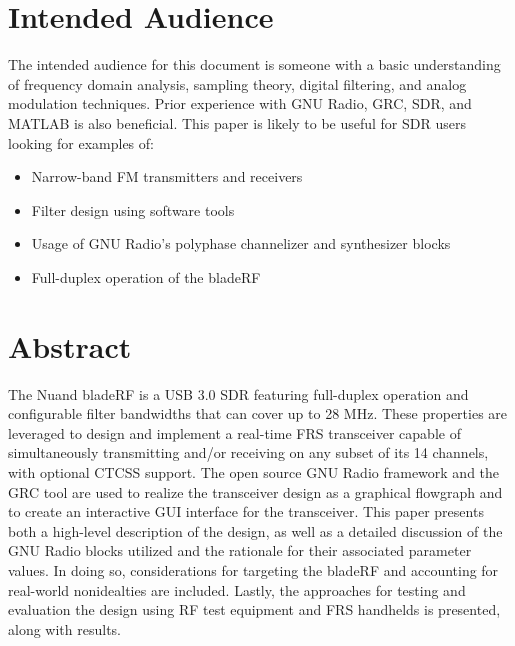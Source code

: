 



\whitepapercover
\docinfo

\section{Intended Audience}
The intended audience for this document is someone with a basic understanding
of frequency domain analysis, sampling theory, digital filtering, and analog
modulation techniques. Prior experience with GNU Radio, \ac{GRC}, \ac{SDR}, and
MATLAB is also beneficial. This paper is likely to be useful for SDR users
looking for examples of:
\begin{itemize}
    \item Narrow-band FM transmitters and receivers
    \item Filter design using software tools
    \item Usage of GNU Radio's polyphase channelizer and synthesizer blocks
    \item Full-duplex operation of the bladeRF
\end{itemize}

\vspace{0.25in}

\section{Abstract}

The Nuand bladeRF is a USB 3.0 \ac{SDR} featuring full-duplex
operation and configurable filter bandwidths that can cover up to 28 MHz.
These properties are leveraged to design and implement a real-time \ac{FRS}
transceiver capable of simultaneously transmitting and/or receiving on any
subset of its 14 channels, with optional \ac{CTCSS} support. The open source
GNU Radio framework and the \ac{GRC} tool are used to realize the transceiver
design as a graphical flowgraph and to create an interactive GUI interface for
the transceiver. This paper presents both a high-level description of the
design, as well as a detailed discussion of the GNU Radio blocks utilized and
the rationale for their associated parameter values. In doing so,
considerations for targeting the bladeRF and accounting for real-world
nonidealties are included. Lastly, the approaches for testing and evaluation
the design using RF test equipment and FRS handhelds is presented, along with
results.

\cleardoublepage

